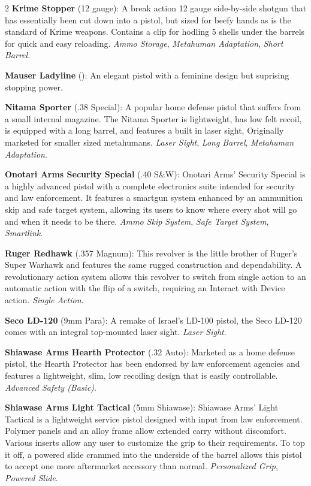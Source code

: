 \documentclass[
  oneside]{article}
\begin{document}
\begin{multicols}{2}
\textbf{Krime Stopper} (12 gauge): A break action
12 gauge side-by-side shotgun that has essentially
been cut down into a pistol, but sized for beefy
hands as is the standard of Krime weapons.
Contains a clip for hodling 5 shells under the
barrels for quick and easy reloading. \emph{Ammo
Storage}, \emph{Metahuman Adaptation}, \emph{Short
Barrel}.

\textbf{Mauser Ladyline} (): An elegant pistol
with a feminine design but suprising stopping
power.

\textbf{Nitama Sporter} (.38 Special): A popular
home defense pistol that suffers from a small
internal magazine. The Nitama Sporter is
lightweight, has low felt recoil, is equipped with
a long barrel, and features a built in laser
sight, Originally marketed for smaller sized
metahumans. \emph{Laser Sight}, \emph{Long
Barrel}, \emph{Metahuman Adaptation}.

\textbf{Onotari Arms Security Special} (.40 S\&W):
Onotari Arms' Security Special is a highly
advanced pistol with a complete electronics suite
intended for security and law enforcement. It
features a smartgun system enhanced by an
ammunition skip and safe target system, allowing
its users to know where every shot will go and
when it needs to be there. \emph{Ammo Skip
System}, \emph{Safe Target System},
\emph{Smartlink}.

\textbf{Ruger Redhawk} (.357 Magnum): This
revolver is the little brother of Ruger's Super
Warhawk and features the same rugged construction
and dependability. A revolutionary action system
allows this revolver to switch from single action
to an automatic action with the flip of a switch,
requiring an Interact with Device action.
\emph{Single Action}.

\textbf{Seco LD-120} (9mm Para): A remake of
Israel's LD-100 pistol, the Seco LD-120 comes with
an integral top-mounted laser sight. \emph{Laser
Sight}.

\textbf{Shiawase Arms Hearth Protector} (.32
Auto): Marketed as a home defense pistol, the
Hearth Protector has been endorsed by law
enforcement agencies and features a lightweight,
slim, low recoiling design that is easily
controllable. \emph{Advanced Safety (Basic)}.

\textbf{Shiawase Arms Light Tactical} (5mm
Shiawase): Shiawase Arms' Light Tactical is a
lightweight service pistol designed with input
from law enforcement. Polymer panels and an alloy
frame allow extended carry without discomfort.
Various inserts allow any user to customize the
grip to their requirements. To top it off, a
powered slide crammed into the underside of the
barrel allows this pistol to accept one more
aftermarket accessory than normal.
\emph{Personalized Grip}, \emph{Powered Slide}.


\end{multicols}
\end{document}
